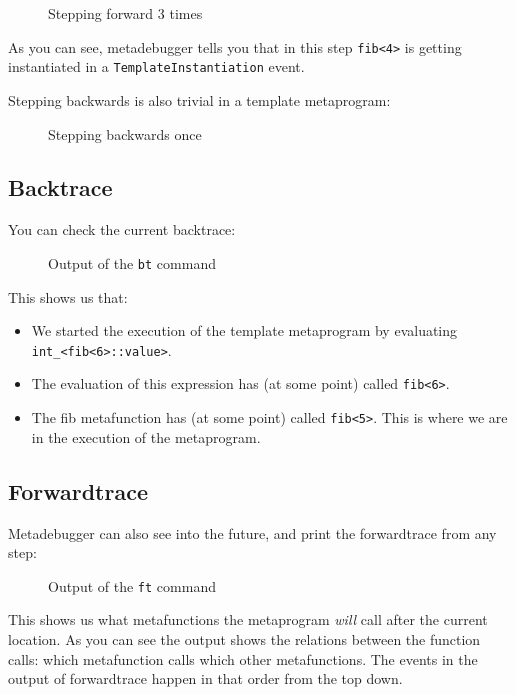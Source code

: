 \begin{figure}[H]
    
    \caption{Stepping forward 3 times}
\end{figure}

\noindent
As you can see, metadebugger tells you that in this step \texttt{fib<4>} is
getting instantiated in a \texttt{TemplateInstantiation} event.

Stepping backwards is also trivial in a template metaprogram:

\begin{figure}[H]
    
    \caption{Stepping backwards once}
\end{figure}

\subsection{Backtrace}

You can check the current backtrace:

\begin{figure}[H]
    
    \caption{Output of the \texttt{bt} command}
\end{figure}

\noindent
This shows us that:

\begin{itemize}
    \item
        We started the execution of the template metaprogram by evaluating \\
        \texttt{int\_<fib<6>::value>}.
    \item
        The evaluation of this expression has (at some point) called
        \texttt{fib<6>}.
    \item
        The fib metafunction has (at some point) called \texttt{fib<5>}.
        This is where we are in the execution of the metaprogram.
\end{itemize}

\subsection{Forwardtrace}

Metadebugger can also see into the future, and print the forwardtrace from any
step:

\begin{figure}[H]
    
    \caption{Output of the \texttt{ft} command}
\end{figure}

\noindent
This shows us what metafunctions the metaprogram \textit{will} call after the
current location. As you can see the output shows the relations between the
function calls: which metafunction calls which other metafunctions. The events
in the output of forwardtrace happen in that order from the top down.

